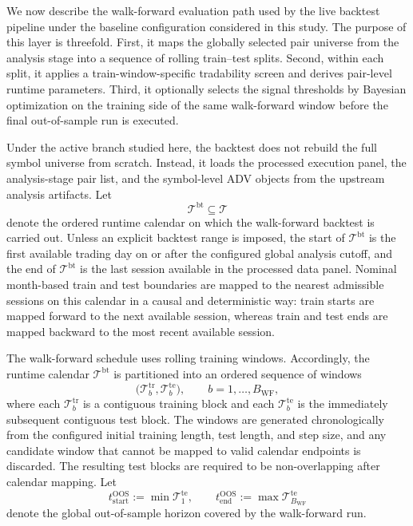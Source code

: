 \documentclass[11pt,a4paper]{article}
\begin{document}
We now describe the walk-forward evaluation path used by the live backtest
pipeline under the baseline configuration considered in this study. The purpose
of this layer is threefold. First, it maps the globally selected pair universe
from the analysis stage into a sequence of rolling train--test splits.
Second, within each split, it applies a train-window-specific tradability screen
and derives pair-level runtime parameters. Third, it optionally selects the
signal thresholds by Bayesian optimization on the training side of the same
walk-forward window before the final out-of-sample run is executed.

Under the active branch studied here, the backtest does not rebuild the full
symbol universe from scratch. Instead, it loads the processed execution panel,
the analysis-stage pair list, and the symbol-level ADV objects from the
upstream analysis artifacts. Let
\[
  \mathcal T^{\mathrm{bt}} \subseteq \mathcal T
\]
denote the ordered runtime calendar on which the walk-forward backtest is
carried out. Unless an explicit backtest range is imposed, the start of
\(\mathcal T^{\mathrm{bt}}\) is the first available trading day on or after the
configured global analysis cutoff, and the end of \(\mathcal T^{\mathrm{bt}}\)
is the last session available in the processed data panel. Nominal month-based
train and test boundaries are mapped to the nearest admissible sessions on this
calendar in a causal and deterministic way: train starts are mapped forward to
the next available session, whereas train and test ends are mapped backward to
the most recent available session.

The walk-forward schedule uses rolling training windows. Accordingly, the
runtime calendar \(\mathcal T^{\mathrm{bt}}\) is partitioned into an ordered
sequence of windows
\[
  \bigl(\mathcal T_b^{\mathrm{tr}}, \mathcal T_b^{\mathrm{te}}\bigr),
  \qquad b=1,\dots,B_{\mathrm{WF}},
\]
where each \(\mathcal T_b^{\mathrm{tr}}\) is a contiguous training block and
each \(\mathcal T_b^{\mathrm{te}}\) is the immediately subsequent contiguous
test block. The windows are generated chronologically from the configured
initial training length, test length, and step size, and any candidate window
that cannot be mapped to valid calendar endpoints is discarded. The resulting
test blocks are required to be non-overlapping after calendar mapping. Let
\[
  t_{\mathrm{start}}^{\mathrm{OOS}} := \min \mathcal T_1^{\mathrm{te}},
  \qquad
  t_{\mathrm{end}}^{\mathrm{OOS}} := \max \mathcal T_{B_{\mathrm{WF}}}^{\mathrm{te}}
\]
denote the global out-of-sample horizon covered by the walk-forward run.
\end{document}
